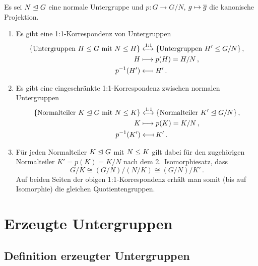 \begin{proposition}
  Es sei $N \mathrel{\trianglelefteq} G$ eine normale Untergruppe und $p \colon G \to G/N$, $g \mapsto \overline{g}$ die kanonische Projektion.
  \begin{enumerate}
    \item
      Es gibt eine 1:1-Korrespondenz von Untergruppen
      \begin{align*}
        \{ \text{Untergruppen $H \mathrel{\leq} G$ mit $N \mathrel{\leq} H$} \}
        &\xleftrightarrow{1:1}
        \{ \text{Untergruppen $H' \mathrel{\leq} G/N$} \} \,,
        \\
        H
        &\longmapsto
        p(H)
        =
        H/N \,,
        \\
        p^{-1}(H')
        &\longmapsfrom
        H' \,.
      \end{align*}
    \item
      Es gibt eine eingeschränkte 1:1-Korrespondenz zwischen normalen Untergruppen
      \begin{align*}
        \{ \text{Normalteiler $K \mathrel{\trianglelefteq} G$ mit $N \mathrel{\leq} K$} \}
        &\xleftrightarrow{1:1}
        \{ \text{Normalteiler $K' \mathrel{\trianglelefteq} G/N$} \} \,,
        \\
        K
        &\longmapsto
        p(K)
        =
        K/N \,,
        \\
        p^{-1}(K')
        &\longmapsfrom
        K' \,.
      \end{align*}
    \item
      Für jeden Normalteiler $K \mathrel{\trianglelefteq} G$ mit $N \mathrel{\leq} K$ gilt dabei für den zugehörigen Normalteiler $K' = p(K) = K/N$ nach dem 2.\ Isomorphiesatz, dass
      \[
              G/K
        \cong (G/N)/(N/K)
        \cong (G/N)/K' \,.
      \]
      Auf beiden Seiten der obigen 1:1-Korrespondenz erhält man somit \textup(bis auf Isomorphie\textup) die gleichen Quotientengruppen.
  \end{enumerate}
\end{proposition}





\section{Erzeugte Untergruppen}



\subsection{Definition erzeugter Untergruppen}

